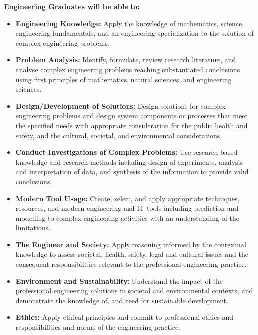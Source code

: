 \noindent \textbf{Engineering Graduates will be able to:}
\begin{itemize}[leftmargin=2.5cm]
    \item[\textbf{PO1.}] \textbf{Engineering Knowledge:} Apply the knowledge of mathematics, science, engineering fundamentals, and an engineering specialization to the solution of complex engineering problems.
    
    \item[\textbf{PO2.}] \textbf{Problem Analysis:} Identify, formulate, review research literature, and analyse complex engineering problems reaching substantiated conclusions using first principles of mathematics, natural sciences, and engineering sciences.
    
    \item[\textbf{PO3.}] \textbf{Design/Development of Solutions:} Design solutions for complex engineering problems and design system components or processes that meet the specified needs with appropriate consideration for the public health and safety, and the cultural, societal, and environmental considerations.
    
    \item[\textbf{PO4.}] \textbf{Conduct Investigations of Complex Problems:} Use research-based knowledge and research methods including design of experiments, analysis and interpretation of data, and synthesis of the information to provide valid conclusions.
    
    \item[\textbf{PO5.}] \textbf{Modern Tool Usage:} Create, select, and apply appropriate techniques, resources, and modern engineering and IT tools including prediction and modelling to complex engineering activities with an understanding of the limitations.
    
    \item[\textbf{PO6.}] \textbf{The Engineer and Society:} Apply reasoning informed by the contextual knowledge to assess societal, health, safety, legal and cultural issues and the consequent responsibilities relevant to the professional engineering practice.
    
    \item[\textbf{PO7.}] \textbf{Environment and Sustainability:} Understand the impact of the professional engineering solutions in societal and environmental contexts, and demonstrate the knowledge of, and need for sustainable development.
    
    \item[\textbf{PO8.}] \textbf{Ethics:} Apply ethical principles and commit to professional ethics and responsibilities and norms of the engineering practice.
    

\end{itemize}
